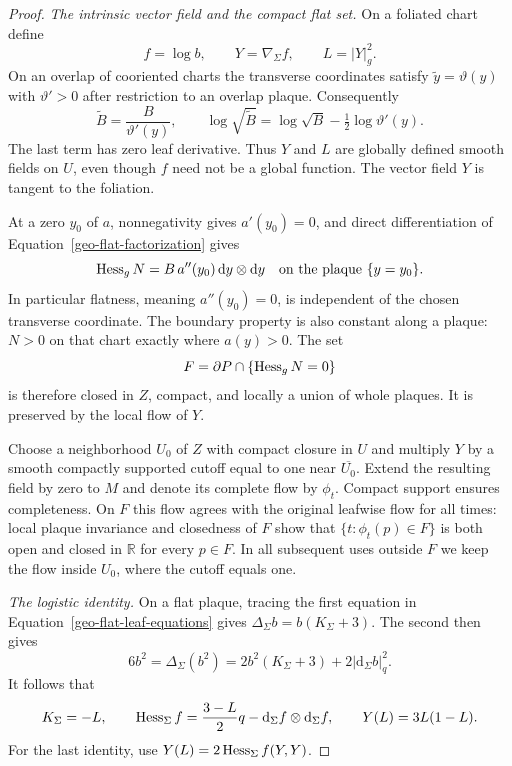 \begin{proof}
\emph{The intrinsic vector field and the compact flat set.}
On a foliated chart define
\[
 f=\log b,\qquad Y=\nabla_\Sigma f,\qquad L=\lvert Y\rvert_g^2.
\]
On an overlap of cooriented charts the transverse coordinates satisfy
$\widetilde y=\vartheta(y)$ with $\vartheta'>0$ after restriction to
an overlap plaque.  Consequently
\[
 \widetilde B=\frac{B}{\vartheta'(y)},\qquad
 \log\sqrt{\widetilde B}
 =\log\sqrt B-\tfrac12\log\vartheta'(y).
\]
The last term has zero leaf derivative.  Thus $Y$ and $L$ are globally
defined smooth fields on $U$, even though $f$ need not be a global
function.  The vector field $Y$ is tangent to the foliation.

At a zero $y_0$ of $a$, nonnegativity gives $a'(y_0)=0$, and direct
differentiation of Equation~\eqref{geo-flat-factorization} gives
\begin{equation}
\label{geo-flat-hessian-zero}
 \operatorname{Hess}_gN=B\,a''(y_0)\,\mathrm dy\otimes\mathrm dy
 \quad\hbox{on the plaque }\{y=y_0\}.
\end{equation}
In particular flatness, meaning $a''(y_0)=0$, is independent of the
chosen transverse coordinate.  The boundary property is also constant
along a plaque: $N>0$ on that chart exactly where $a(y)>0$.
The set
\begin{equation}
\label{geo-flat-compact-flat-set}
 F=\partial P\cap\{\operatorname{Hess}_gN=0\}
\end{equation}
is therefore closed in $Z$, compact, and locally a union of whole
plaques.  It is preserved by the local flow of $Y$.

Choose a neighborhood $U_0$ of $Z$ with compact closure in $U$ and
multiply $Y$ by a smooth compactly supported cutoff equal to one near
$\overline{U_0}$.  Extend the resulting field by zero to $M$ and denote
its complete flow by $\phi_t$.  Compact support ensures completeness.
On $F$ this flow agrees with the original leafwise flow for all times:
local plaque invariance and closedness of $F$ show that
$\{t:\phi_t(p)\in F\}$ is both open and closed in $\mathbb R$ for
every $p\in F$.  In all subsequent uses outside $F$ we keep the flow
inside $U_0$, where the cutoff equals one.

\emph{The logistic identity.}
On a flat plaque, tracing the first equation in
Equation~\eqref{geo-flat-leaf-equations} gives
$\Delta_\Sigma b=b(K_\Sigma+3)$.  The second then gives
\[
 6b^2=\Delta_\Sigma(b^2)
 =2b^2(K_\Sigma+3)+2\lvert\mathrm d_\Sigma b\rvert_q^2.
\]
It follows that
\begin{equation}
\label{geo-flat-logistic-identities}
 K_\Sigma=-L,\qquad
 \operatorname{Hess}_\Sigma f=\frac{3-L}{2}q-
 \mathrm d_\Sigma f\otimes\mathrm d_\Sigma f,
 \qquad Y(L)=3L(1-L).
\end{equation}
For the last identity, use
$Y(L)=2\operatorname{Hess}_\Sigma f(Y,Y)$.


\end{proof}
